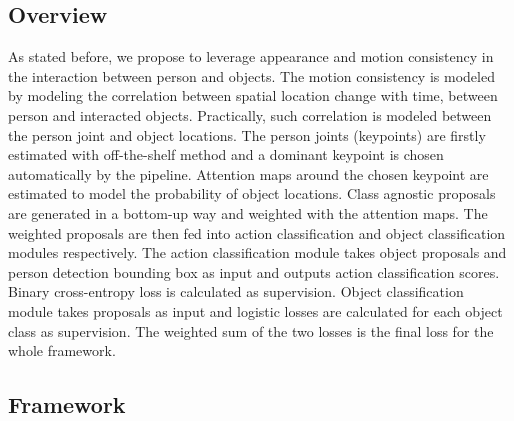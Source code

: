 \subsection{Overview}
As stated before, we propose to leverage appearance and motion consistency in the interaction between person and objects. The motion consistency is modeled by modeling the correlation between spatial location change with time, between person and interacted objects. Practically, such correlation is modeled between the person joint and object locations. The person joints (keypoints) are firstly estimated with off-the-shelf method and a dominant keypoint is chosen automatically by the pipeline. Attention maps around the chosen keypoint are estimated to model the probability of object locations. Class agnostic proposals are generated in a bottom-up way and weighted with the attention maps. The weighted proposals are then fed into action classification and object classification modules respectively. The action classification module takes object proposals and person detection bounding box as input and outputs action classification scores. Binary cross-entropy loss is calculated as supervision. Object classification module takes proposals as input and logistic losses are calculated for each object class as supervision. The weighted sum of the two losses is the final loss for the whole framework. 

\subsection{Framework}


